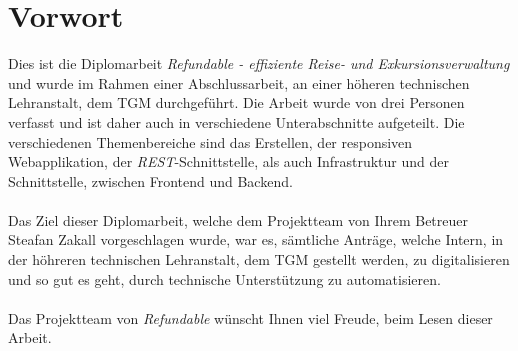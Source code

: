 \chapter{Vorwort}
Dies ist die Diplomarbeit \textit{Refundable - effiziente Reise- und Exkursionsverwaltung} und wurde im Rahmen einer Abschlussarbeit, an einer höheren technischen Lehranstalt, dem TGM durchgeführt. Die Arbeit wurde von drei Personen verfasst und ist daher auch in verschiedene Unterabschnitte aufgeteilt. Die verschiedenen Themenbereiche sind das Erstellen, der responsiven Webapplikation, der \textit{REST}-Schnittstelle, als auch Infrastruktur und der Schnittstelle, zwischen Frontend und Backend.\\
~\\
Das Ziel dieser Diplomarbeit, welche dem Projektteam von Ihrem Betreuer Steafan Zakall vorgeschlagen wurde, war es, sämtliche Anträge, welche Intern, in der höhreren technischen Lehranstalt, dem TGM gestellt werden, zu digitalisieren und so gut es geht, durch technische Unterstützung zu automatisieren.\\
~\\
Das Projektteam von \textit{Refundable} wünscht Ihnen viel Freude, beim Lesen dieser Arbeit.